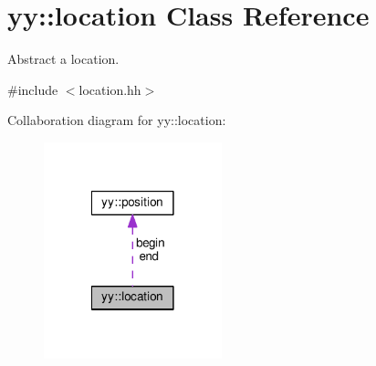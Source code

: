 \hypertarget{classyy_1_1location}{\section{yy\-:\-:location Class Reference}
\label{classyy_1_1location}
}


Abstract a location.  




{\ttfamily \#include $<$location.\-hh$>$}



Collaboration diagram for yy\-:\-:location\-:\nopagebreak
\begin{figure}[H]
\begin{center}
\leavevmode
\includegraphics[width=146pt]{classyy_1_1location__coll__graph}
\end{center}
\end{figure}
